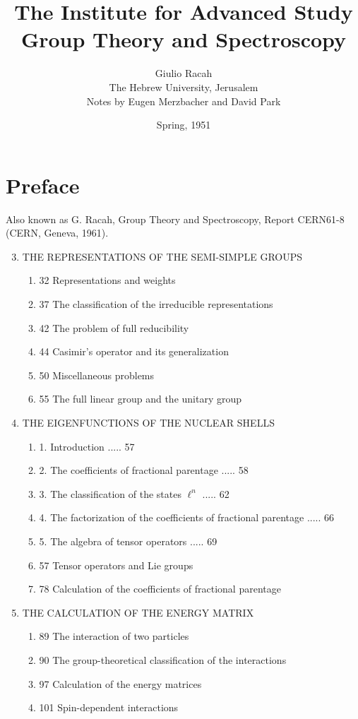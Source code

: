 \documentclass[a4paper,12pt]{article}
\title{The Institute for Advanced Study \\ Group Theory and Spectroscopy }
\author{Giulio Racah \\The Hebrew University, Jerusalem\\Notes by Eugen Merzbacher and David Park}
\date{Spring, 1951}
\begin{document}
\maketitle
\section*{Preface}

Also known as G. Racah, Group Theory and Spectroscopy, Report CERN61-8 (CERN, Geneva, 1961).
\tableofcontents


\begin{enumerate}
\setcounter{enumi}{2}
\item THE REPRESENTATIONS OF THE SEMI-SIMPLE GROUPS
\begin{enumerate}
\item 32 Representations and weights
\item 37 The classification of the irreducible representations
\item 42 The problem of full reducibility
\item 44 Casimir's operator and its generalization
\item 50 Miscellaneous problems
\item 55 The full linear group and the unitary group
\end{enumerate}
\item THE EIGENFUNCTIONS OF THE NUCLEAR SHELLS
\begin{enumerate}
\item 1. Introduction ..... 57
\item 2. The coefficients of fractional parentage ..... 58
\item 3. The classification of the states \(\ell^n\) ..... 62
\item 4. The factorization of the coefficients of fractional parentage ..... 66
\item 5. The algebra of tensor operators ..... 69
\item 57 Tensor operators and Lie groups
\item 78 Calculation of the coefficients of fractional parentage
\end{enumerate}
\item THE CALCULATION OF THE ENERGY MATRIX
\begin{enumerate}
\item 89 The interaction of two particles
\item 90 The group-theoretical classification of the interactions
\item 97 Calculation of the energy matrices
\item 101 Spin-dependent interactions
\end{enumerate}
\end{enumerate}
\end{document}
